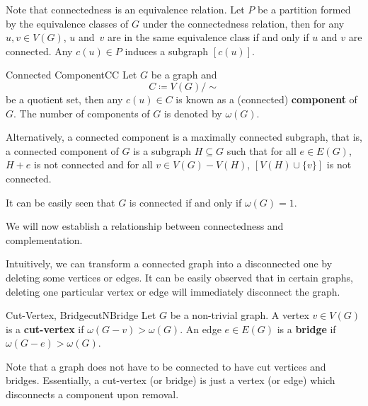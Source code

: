 \documentclass[math]{amznotes}
\makeatletter
\let\save@mathaccent\mathaccent
\newcommand*\if@single[3]{%
  \setbox0\hbox{${\mathaccent"0362{#1}}^H$}%
  \setbox2\hbox{${\mathaccent"0362{\kern0pt#1}}^H$}%
  \ifdim\ht0=\ht2 #3\else #2\fi
  }
\newcommand*\rel@kern[1]{\kern#1\dimexpr\macc@kerna}
\newcommand*\widebar[1]{\@ifnextchar^{{\wide@bar{#1}{0}}}{\wide@bar{#1}{1}}}
\newcommand*\wide@bar[2]{\if@single{#1}{\wide@bar@{#1}{#2}{1}}{\wide@bar@{#1}{#2}{2}}}
\newcommand*\wide@bar@[3]{%
  \begingroup
  \def\mathaccent##1##2{%
    \let\mathaccent\save@mathaccent
    \if#32 \let\macc@nucleus\first@char \fi
    \setbox\z@\hbox{$\macc@style{\macc@nucleus}_{}$}%
    \setbox\tw@\hbox{$\macc@style{\macc@nucleus}{}_{}$}%
    \dimen@\wd\tw@
    \advance\dimen@-\wd\z@
    \divide\dimen@ 3
    \@tempdima\wd\tw@
    \advance\@tempdima-\scriptspace
    \divide\@tempdima 10
    \advance\dimen@-\@tempdima
    \ifdim\dimen@>\z@ \dimen@0pt\fi
    \rel@kern{0.6}\kern-\dimen@
    \if#31
      \overline{\rel@kern{-0.6}\kern\dimen@\macc@nucleus\rel@kern{0.4}\kern\dimen@}%
      \advance\dimen@0.4\dimexpr\macc@kerna
      \let\final@kern#2%
      \ifdim\dimen@<\z@ \let\final@kern1\fi
      \if\final@kern1 \kern-\dimen@\fi
    \else
      \overline{\rel@kern{-0.6}\kern\dimen@#1}%
    \fi
  }%
  \macc@depth\@ne
  \let\math@bgroup\@empty \let\math@egroup\macc@set@skewchar
  \mathsurround\z@ \frozen@everymath{\mathgroup\macc@group\relax}%
  \macc@set@skewchar\relax
  \let\mathaccentV\macc@nested@a
  \if#31
    \macc@nested@a\relax111{#1}%
  \else
    \def\gobble@till@marker##1\endmarker{}%
    \futurelet\first@char\gobble@till@marker#1\endmarker
    \ifcat\noexpand\first@char A\else
      \def\first@char{}%
    \fi
    \macc@nested@a\relax111{\first@char}%
  \fi
  \endgroup
}
\theoremstyle{remark}
\newcommand{\0}{\mathbf{0}}
\newcommand{\1}{\mathbf{1}}
\makeatother
\begin{document}
Note that connectedness is an equivalence relation. Let $P$ be a partition formed by the equivalence classes of $G$ under the connectedness relation, then for any $u, v \in V(G)$, $u$ and~$v$ are in the same equivalence class if and only if $u$ and $v$ are connected. Any $c(u) \in P$ induces a subgraph $[c(u)]$.
\begin{dfnbox}{Connected Component}{CC}
    Let $G$ be a graph and 
    \begin{equation*}
        C \coloneqq V(G) \slash \sim
    \end{equation*}
    be a quotient set, then any $c(u) \in C$ is known as a (connected) {\color{red} \textbf{component}} of $G$. The number of components of $G$ is denoted by $\omega(G)$.
\end{dfnbox}
Alternatively, a connected component is a maximally connected subgraph, that is, a connected component of $G$ is a subgraph $H \subseteq G$ such that for all $e \in E(G)$, $H + e$ is not connected and for all $v \in V(G) - V(H)$, $\left[V(H) \cup \{v\}\right]$ is not connected.

It can be easily seen that $G$ is connected if and only if $\omega(G) = 1$.

We will now establish a relationship between connectedness and complementation.
Intuitively, we can transform a connected graph into a disconnected one by deleting some vertices or edges. It can be easily observed that in certain graphs, deleting one particular vertex or edge will immediately disconnect the graph.
\begin{dfnbox}{Cut-Vertex, Bridge}{cutNBridge}
    Let $G$ be a non-trivial graph. A vertex $v \in V(G)$ is a {\color{red} \textbf{cut-vertex}} if $\omega(G - v) > \omega(G)$. An edge $e \in E(G)$ is a {\color{red} \textbf{bridge}} if $\omega(G - e) > \omega(G)$.
\end{dfnbox}
Note that a graph does not have to be connected to have cut vertices and bridges. Essentially, a cut-vertex (or bridge) is just a vertex (or edge) which disconnects a component upon removal.
\end{document}
